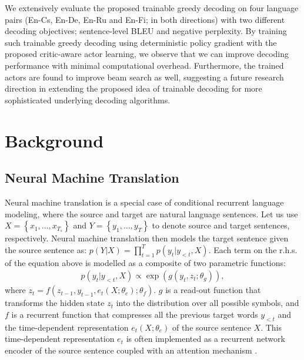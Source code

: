 We extensively evaluate the proposed trainable greedy decoding on four language pairs (En-Cs, En-De, En-Ru and En-Fi; in both directions) with two different decoding objectives; sentence-level BLEU and negative perplexity. By training such trainable greedy decoding using deterministic policy gradient with the proposed critic-aware actor learning, we observe that we can improve decoding performance with minimal computational overhead. Furthermore, the trained actors are found to improve beam search as well, suggesting a future research direction in extending the proposed idea of trainable decoding for more sophisticated underlying decoding algorithms.

\section{Background}

\subsection{Neural Machine Translation}

Neural machine translation is a special case of conditional recurrent language modeling, where the source and target are natural language sentences. Let us use $X=\left\{ x_1, \ldots, x_{T_s} \right\}$ and $Y=\left\{ y_1, \ldots, y_T \right\}$ to denote source and target sentences, respectively. Neural machine translation then models the target sentence given the source sentence as:
$p(Y|X) = \prod_{t=1}^T p(y_t | y_{<t}, X)$.
Each term on the r.h.s. of the equation above is modelled as a composite of two parametric functions:
\begin{align*}
p(y_t|y_{<t}, X)\propto \exp\left(g\left(y_t, z_t; \theta_g\right)\right),
\end{align*}
where 
$z_t = f(z_{t-1}, y_{t-1}, e_t(X; \theta_e); \theta_f)$.
$g$ is a read-out function that transforms the hidden state $z_t$ into the distribution over all possible symbols, and $f$ is a recurrent function that compresses all the previous target words $y_{<t}$ and the time-dependent representation $e_t(X; \theta_e)$ of the source sentence $X$. This time-dependent representation $e_t$ is often implemented as a recurrent network encoder of the source sentence coupled with an attention mechanism \citep{bahdanau2014neural}.

